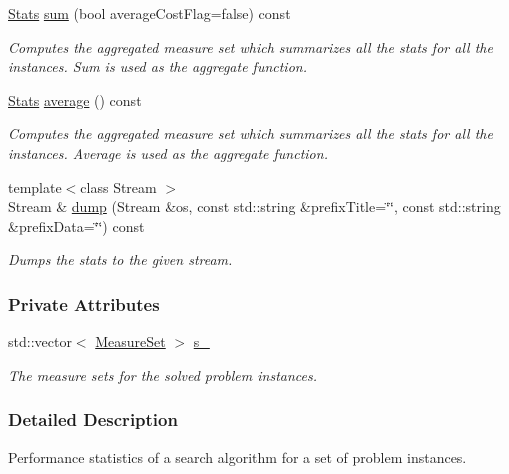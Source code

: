 \begin{DoxyCompactItemize}
\hyperlink{structStats}{Stats} \hyperlink{structStats_ae1470ecb280adcdc660cb71b1fb441ef}{sum} (bool average\+Cost\+Flag=false) const 
\begin{DoxyCompactList}\small\item\em Computes the aggregated measure set which summarizes all the stats for all the instances. Sum is used as the aggregate function. \end{DoxyCompactList}\item 
\hyperlink{structStats}{Stats} \hyperlink{structStats_a02657a88278a048272d58674a047ed07}{average} () const 
\begin{DoxyCompactList}\small\item\em Computes the aggregated measure set which summarizes all the stats for all the instances. Average is used as the aggregate function. \end{DoxyCompactList}\item 
{\footnotesize template$<$class Stream $>$ }\\Stream \& \hyperlink{structStats_ae5c4ea6cb68f76f83c55df5bd8b665b9}{dump} (Stream \&os, const std\+::string \&prefix\+Title=\char`\"{}\char`\"{}, const std\+::string \&prefix\+Data=\char`\"{}\char`\"{}) const 
\begin{DoxyCompactList}\small\item\em Dumps the stats to the given stream. \end{DoxyCompactList}\end{DoxyCompactItemize}
\subsubsection*{Private Attributes}
\begin{DoxyCompactItemize}
\item 
std\+::vector$<$ \hyperlink{structMeasureSet}{Measure\+Set} $>$ \hyperlink{structStats_ad9f07efc47327d48caf720bc8940fc45}{s\+\_\+}\hypertarget{structStats_ad9f07efc47327d48caf720bc8940fc45}{}\label{structStats_ad9f07efc47327d48caf720bc8940fc45}

\begin{DoxyCompactList}\small\item\em The measure sets for the solved problem instances. \end{DoxyCompactList}\end{DoxyCompactItemize}


\subsubsection{Detailed Description}
Performance statistics of a search algorithm for a set of problem instances. 

